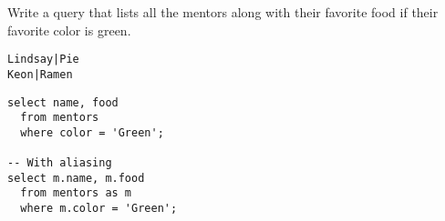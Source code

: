 \begin{blocksection}
\question Write a query that lists all the mentors along with their favorite food if their favorite color is green.

\begin{lstlisting}
Lindsay|Pie
Keon|Ramen
\end{lstlisting}

\begin{solution}[1in]
\begin{lstlisting}
select name, food
  from mentors
  where color = 'Green';
  
-- With aliasing
select m.name, m.food
  from mentors as m
  where m.color = 'Green';
\end{lstlisting}
\end{solution}
\end{blocksection}
